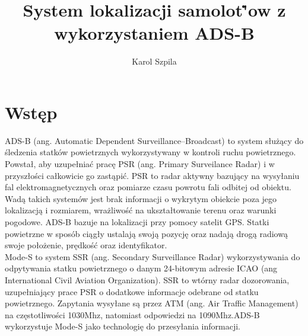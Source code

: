 \documentclass[eng,printmode]{mgr}
\title{System lokalizacji samolot\.'ow z wykorzystaniem ADS-B}
\author{Karol Szpila}
\begin{document}

\maketitle %

\tableofcontents %

\let\cleardoublepage\clearpage %

\chapter{ Wstęp }
ADS-B (ang. Automatic Dependent Surveillance–Broadcast) to system służący do śledzenia statków powietrznych wykorzystywany w kontroli ruchu powietrznego. Powstał, aby uzupełniać pracę PSR (ang. Primary Surveilance Radar) i w przyszłości całkowicie go zastąpić. PSR to radar aktywny bazujący na wysyłaniu fal elektromagnetycznych oraz pomiarze czasu powrotu fali odbitej od obiektu. Wadą takich systemów jest brak informacji o wykrytym obiekcie poza jego lokalizacją i rozmiarem, wrażliwość na ukształtowanie terenu oraz warunki pogodowe. ADS-B bazuje na lokalizacji przy pomocy satelit GPS. Statki powietrzne w sposób ciągły ustalają swoją pozycję oraz nadają drogą radiową swoje położenie, prędkość oraz identyfikator.
\\


Mode-S to system SSR (ang. Secondary Surveillance Radar) wykorzystywania do odpytywania statku powietrznego o danym 24-bitowym adresie ICAO (ang International Civil Aviation Organization). SSR to wtórny radar dozorowania, uzupełniający prace PSR o dodatkowe informacje odebrane od statku powietrznego. Zapytania wysyłane są przez ATM (ang. Air Traffic Management) na częstotliwości 1030Mhz, natomiast odpowiedzi na 1090Mhz.ADS-B wykorzystuje Mode-S jako technologię do przesyłania informacji.
\end{document}
